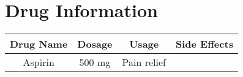 \documentclass[12pt, a4paper]{book}
\begin{document}
\chapter{Drug Information}

\begin{table}[h!]
\centering
\begin{tabular}{|c|c|c|c|}
\hline
\textbf{Drug Name} & \textbf{Dosage} & \textbf{Usage} & \textbf{Side Effects} \\
\hline
Aspirin & 500 mg & Pain relief & \\
\hline
\end{tabular}
\end{table}
\end{document}
